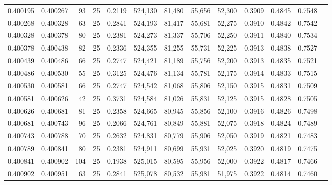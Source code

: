 \begin{tabular}{rrrrrrrrrrrrr}
0.400195 & 0.400267 &    93 &  25 &                                     0.2119 & 524,130 &  81,480 &  55,656 &  52,300 & 0.3909 & 0.4845 & 0.7548 \\
0.400268 & 0.400328 &    63 &  25 &                                     0.2841 & 524,193 &  81,417 &  55,681 &  52,275 & 0.3910 & 0.4842 & 0.7542 \\
0.400328 & 0.400378 &    80 &  25 &                                     0.2381 & 524,273 &  81,337 &  55,706 &  52,250 & 0.3911 & 0.4840 & 0.7534 \\
0.400378 & 0.400438 &    82 &  25 &                                     0.2336 & 524,355 &  81,255 &  55,731 &  52,225 & 0.3913 & 0.4838 & 0.7527 \\
0.400439 & 0.400486 &    66 &  25 &                                     0.2747 & 524,421 &  81,189 &  55,756 &  52,200 & 0.3913 & 0.4835 & 0.7521 \\
0.400486 & 0.400530 &    55 &  25 &                                     0.3125 & 524,476 &  81,134 &  55,781 &  52,175 & 0.3914 & 0.4833 & 0.7515 \\
0.400530 & 0.400581 &    66 &  25 &                                     0.2747 & 524,542 &  81,068 &  55,806 &  52,150 & 0.3915 & 0.4831 & 0.7509 \\
0.400581 & 0.400626 &    42 &  25 &                                     0.3731 & 524,584 &  81,026 &  55,831 &  52,125 & 0.3915 & 0.4828 & 0.7505 \\
0.400626 & 0.400681 &    81 &  25 &                                     0.2358 & 524,665 &  80,945 &  55,856 &  52,100 & 0.3916 & 0.4826 & 0.7498 \\
0.400681 & 0.400743 &    96 &  25 &                                     0.2066 & 524,761 &  80,849 &  55,881 &  52,075 & 0.3918 & 0.4824 & 0.7489 \\
0.400743 & 0.400788 &    70 &  25 &                                     0.2632 & 524,831 &  80,779 &  55,906 &  52,050 & 0.3919 & 0.4821 & 0.7483 \\
0.400789 & 0.400841 &    80 &  25 &                                     0.2381 & 524,911 &  80,699 &  55,931 &  52,025 & 0.3920 & 0.4819 & 0.7475 \\
0.400841 & 0.400902 &   104 &  25 &                                     0.1938 & 525,015 &  80,595 &  55,956 &  52,000 & 0.3922 & 0.4817 & 0.7466 \\
0.400902 & 0.400951 &    63 &  25 &                                     0.2841 & 525,078 &  80,532 &  55,981 &  51,975 & 0.3922 & 0.4814 & 0.7460 \\

\end{tabular}
